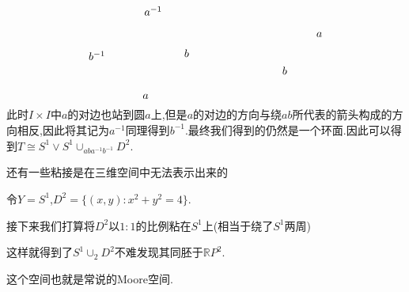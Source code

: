 \documentclass{article}
\begin{document}
\begin{example}
\[\begin{tikzpicture}[x=0.75pt,y=0.75pt,yscale=-1,xscale=1]
\draw (349,79.4) node [anchor=north west][inner sep=0.75pt]    {$a$};
\draw (308,121.4) node [anchor=north west][inner sep=0.75pt]    {$b$};
\draw (140,154.4) node [anchor=north west][inner sep=0.75pt]    {$a$};
\draw (190,100.4) node [anchor=north west][inner sep=0.75pt]    {$b$};
\draw (142,48.4) node [anchor=north west][inner sep=0.75pt]    {$a^{-1}$};
\draw (75,102.4) node [anchor=north west][inner sep=0.75pt]    {$b^{-1}$};
\end{tikzpicture}\]
此时$I \times I$中$a$的对边也站到圆$a$上,但是$a$的对边的方向与绕$ab$所代表的箭头构成的方向相反,因此将其记为$a^{-1}$同理得到$b^{-1}$.最终我们得到的仍然是一个环面.因此可以得到$T \cong S^1 \lor S^1 \cup_{aba^{-1}b^{-1}}D^2$.
\end{example}
还有一些粘接是在三维空间中无法表示出来的
\begin{example}
    令$Y = S^1$,$D^2 = \{(x,y):x^2+y^2 = 4\}$.
    

    接下来我们打算将$D^2$以$1:1$的比例粘在$S^1$上(相当于绕了$S^1$两周)


    这样就得到了$S^1 \cup_2 D^2$不难发现其同胚于$\mathbb{R}P^2$.


    这个空间也就是常说的Moore空间.
\end{example}
\end{document}
